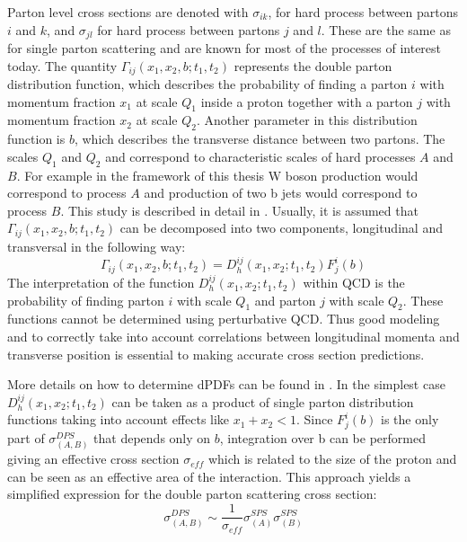 \par Parton level cross sections are denoted with $\sigma_{ik}$, for hard process between partons $i$ and $k$, and $\sigma_{jl}$ for hard process between partons $j$ and $l$. These are the same as for single parton scattering and are known for most of the processes of interest today. The quantity $\Gamma_{ij}(x_1,x_2,b;t_1,t_2)$ represents the double parton distribution function, which describes the probability of finding a parton $i$ with momentum fraction $x_1$ at scale $Q_1$ inside a proton together with a parton $j$ with momentum fraction $x_2$ at scale $Q_2$. Another parameter in this distribution function is $b$, which describes the transverse distance between two partons. The scales $Q_1$ and $Q_2$ and correspond to characteristic scales of hard processes $A$ and $B$. For example in the framework of this thesis W boson production would correspond to process $A$ and production of two b jets would correspond to process $B$. This study is described in detail in \cite{Quackenbush:2011bf}. Usually, it is assumed that $\Gamma_{ij}(x_1,x_2,b;t_1,t_2)$ can be decomposed into two components, longitudinal and transversal in the following way:
\begin{equation}
\Gamma_{ij}(x_1,x_2,b;t_1,t_2) = D^{ij}_h(x_1,x_2;t_1,t_2)F_j^i(b)
\end{equation} 
The interpretation of the function $D^{ij}_h(x_1,x_2;t_1,t_2)$ within QCD is the probability of finding parton $i$ with scale $Q_1$ and parton $j$ with scale $Q_2$. These functions cannot be determined using perturbative QCD. Thus good modeling and to correctly take into account correlations between longitudinal momenta and transverse position is essential to making accurate cross section predictions. 
\par More details on how to determine dPDFs can be found in \cite{Gaunt:2009re}. In the simplest case $D^{ij}_h(x_1,x_2;t_1,t_2)$ can be taken as a product of single parton distribution functions taking into account effects like $x_1+x_2<1$. Since $F_j^i(b)$ is the only part of $\sigma_{(A,B)}^{DPS}$ that depends only on $b$, integration over b can be performed giving an effective cross section $\sigma_{eff}$ which is related to the size of the proton and can be seen as an effective area of the interaction. This approach yields a simplified expression for the double parton scattering cross section:
\begin{equation}
\sigma_{(A,B)}^{DPS} \sim \frac{1}{\sigma_{eff}} \sigma^{SPS}_{(A)} \sigma^{SPS}_{(B)}
\end{equation}
